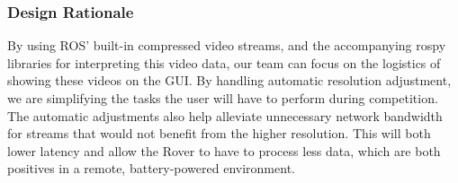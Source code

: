 \subsubsection{Design Rationale}
By using ROS' built-in compressed video streams, and the accompanying rospy libraries for interpreting this video data, our team can focus on the logistics of showing these videos on the GUI.
By handling automatic resolution adjustment, we are simplifying the tasks the user will have to perform during competition.
The automatic adjustments also help alleviate unnecessary network bandwidth for streams that would not benefit from the higher resolution. 
This will both lower latency and allow the Rover to have to process less data, which are both positives in a remote, battery-powered environment.
